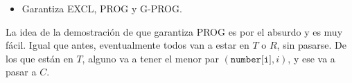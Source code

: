 \documentclass[11pt, spanish]{report}
\begin{document}
\begin{itemize}
  \item Garantiza EXCL, PROG y G-PROG.
\end{itemize}

La idea de la demostración de que garantiza PROG es por el absurdo y es muy fácil. Igual que antes, eventualmente todos van a estar en $T$ o $R$, sin pasarse. De los que están en $T$, alguno va a tener el menor par $(\texttt{number[i]}, i)$, y ese va a pasar a $C$.
\end{document}
